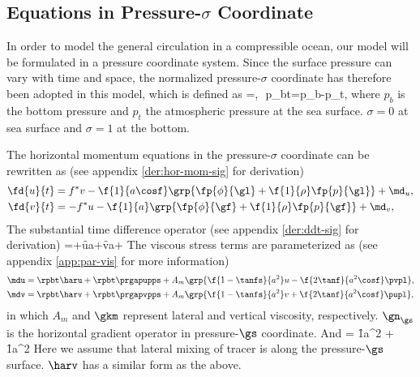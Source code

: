 
\subsection{Equations in Pressure-$\sigma$ Coordinate}

In order to model the general circulation in a compressible ocean,
our model will be formulated in a pressure coordinate system. Since
the surface pressure can vary with time and space, the normalized
pressure-$\sigma$ coordinate has therefore been adopted in this model,
which is defined as
\beeq \label{eq:def-sig}
\sigma=,\,\, p_{bt}=p_{b}-p_{t},
\eneq
where $p_{b}$ is the bottom pressure and $p_{t}$ the atmospheric
pressure at the sea surface. $\sigma=0$ at sea surface and $\sigma=1$
at the bottom.

The horizontal momentum equations in the pressure-$\sigma$ coordinate can
be rewritten as (see appendix \ref{der:hor-mom-sig} for derivation)
\bese \label{eq:5}
\begin{align}
  \fd{u}{t} &= f^{*}v-\f{1}{a\cosf}\grp{ \fp{\phi}{\gl}+\f{1}{\rho}\fp{p}{\gl}
}+\md_u, \\
  \fd{v}{t} &=-f^{*}u-\f{1}{a}\grp{\fp{\phi}{\gf}+\f{1}{\rho}\fp{p}{\gf}}+\md_v,
\end{align}
\ense
The substantial time difference operator (see appendix
\ref{der:ddt-sig} for derivation)
\beeq \label{eq:21}
=+\f{u}{a\cosf}\fp{}{\gl}+\f{v}{a}\fp{}{\gf}+\dgs\fp{}{\gs}
\eneq
The viscous stress terms are parameterized as
(see appendix \ref{app:par-vis} for more information)
\bese \label{eq:37}
\begin{align} 
\mdu&=\rpbt\haru + \rpbt\prgapupps + 
  A_{m}\grp{\f{1-\tanfs}{a^2}u - \f{2\tanf}{a^2\cosf}\pvpl},\label{eq:24}\\
\mdv&=\rpbt\harv + \rpbt\prgapvpps + 
  A_{m}\grp{\f{1-\tanfs}{a^2}v + \f{2\tanf}{a^2\cosf}\pupl},
\end{align}
\ense
in which $A_m$ and $\gkm$ represent lateral and vertical viscosity, respectively.
$\gn_\gs$ is the horizontal gradient operator in pressure-$\gs$
coordinate. And 
\beeq
\haru = \f{1}{a^2\cosfs}\ppl{} +
\f{1}{a^2\cosf}\ppf{}
\eneq
Here we assume that lateral mixing of tracer is along the
pressure-$\gs$ surface. $\harv$ has a similar form as the above.

